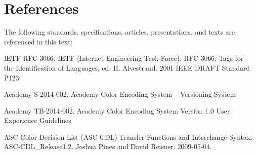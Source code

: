 \numberedformat
\chapter{References}
The following standards, specifications, articles, presentations, and texts are referenced in this text:

IETF RFC 3066:  IETF (Internet Engineering Task Force). RFC 3066: Tags for the Identification of Languages, ed. H. Alvestrand. 2001 IEEE DRAFT Standard P123

Academy S-2014-002, Academy Color Encoding System -- Versioning System

Academy TB-2014-002, Academy Color Encoding System Version 1.0 User Experience Guidelines

ASC Color Decision List (ASC CDL) Transfer Functions and Interchange Syntax. ASC-CDL\_Release1.2. 
Joshua Pines and David Reisner. 2009-05-04.